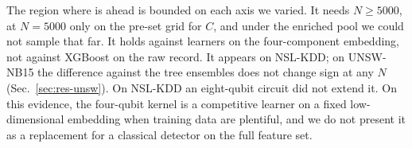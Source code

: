 The region where \QSVM{} is ahead is bounded on each axis we varied. It needs $N\geq5000$, at $N=5000$ only on the pre-set
grid for $C$, and under the enriched pool we could not sample that far. It holds against learners on the
four-component embedding, not against XGBoost on the raw record. It appears on NSL-KDD; on
UNSW-NB15 the difference against the tree ensembles does not change sign at any $N$
(Sec.~\ref{sec:res-unsw}). On NSL-KDD an eight-qubit circuit did not extend it. On this evidence, the
four-qubit kernel is a competitive learner on a fixed low-dimensional embedding when training
data are plentiful, and we do not present it as a replacement for a classical detector on the
full feature set.
